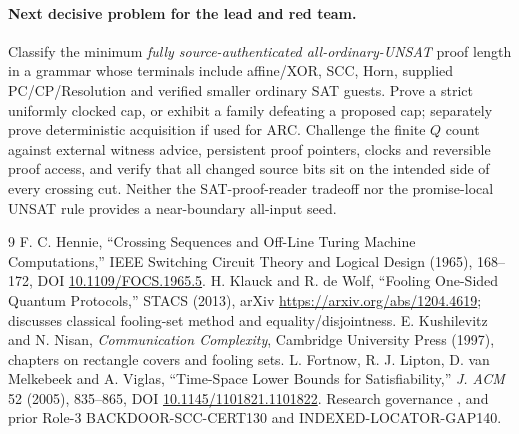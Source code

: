 \documentclass[11pt]{article}
\begin{document}
\paragraph{Next decisive problem for the lead and red team.}
Classify the minimum \emph{fully source-authenticated all-ordinary-UNSAT} proof length in a grammar whose terminals include affine/XOR, SCC, Horn, supplied PC/CP/Resolution and verified smaller ordinary SAT guests. Prove a strict uniformly clocked cap, or exhibit a family defeating a proposed cap; separately prove deterministic acquisition if used for ARC. Challenge the finite $Q$ count against external witness advice, persistent proof pointers, clocks and reversible proof access, and verify that all changed source bits sit on the intended side of every crossing cut. Neither the SAT-proof-reader tradeoff nor the promise-local UNSAT rule provides a near-boundary all-input seed.

\begin{thebibliography}{9}
 F. C. Hennie, ``Crossing Sequences and Off-Line Turing Machine Computations,'' IEEE Switching Circuit Theory and Logical Design (1965), 168--172, DOI \href{https://doi.org/10.1109/FOCS.1965.5}{10.1109/FOCS.1965.5}.
 H. Klauck and R. de Wolf, ``Fooling One-Sided Quantum Protocols,'' STACS (2013), arXiv \url{https://arxiv.org/abs/1204.4619}; discusses classical fooling-set method and equality/disjointness.
 E. Kushilevitz and N. Nisan, \emph{Communication Complexity}, Cambridge University Press (1997), chapters on rectangle covers and fooling sets.
 L. Fortnow, R. J. Lipton, D. van Melkebeek and A. Viglas, ``Time-Space Lower Bounds for Satisfiability,'' \emph{J. ACM} 52 (2005), 835--865, DOI \href{https://doi.org/10.1145/1101821.1101822}{10.1145/1101821.1101822}.
 Research governance , and prior Role-3 BACKDOOR-SCC-CERT130 and INDEXED-LOCATOR-GAP140.
\end{thebibliography}
\end{document}

